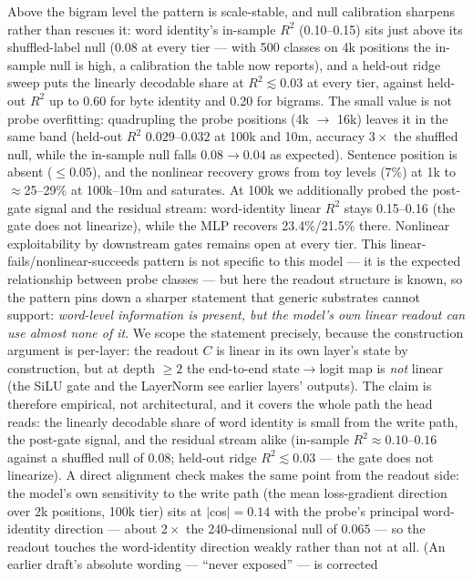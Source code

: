 \documentclass[11pt]{article}
\begin{document}
Above the bigram level the pattern is scale-stable, and null calibration
sharpens rather than rescues it: word identity's in-sample $R^2$
(0.10--0.15) sits just above its shuffled-label null (0.08 at every tier
--- with 500 classes on 4k positions the in-sample null is high, a
calibration the table now reports), and a held-out ridge sweep puts the
linearly decodable share at $R^2 \lesssim 0.03$ at every tier, against
held-out $R^2$ up to 0.60 for byte identity and 0.20 for bigrams. The
small value is not probe overfitting: quadrupling the probe positions
(4k $\to$ 16k) leaves it in the same band (held-out $R^2$
$0.029$--$0.032$ at 100k and 10m, accuracy $3\times$ the shuffled null,
while the in-sample null falls $0.08 \to 0.04$ as expected).
Sentence position is absent ($\le 0.05$), and the nonlinear recovery
grows from toy levels (7\%) at 1k to $\approx$25--29\% at 100k--10m and
saturates.
At 100k we additionally probed the post-gate signal and the residual
stream: word-identity linear $R^2$ stays 0.15--0.16 (the gate does not
linearize), while the MLP recovers 23.4\%/21.5\% there. Nonlinear
exploitability by downstream gates remains open at every tier.
This linear-fails/nonlinear-succeeds
pattern is not specific to this model --- it is the expected relationship
between probe classes --- but here the readout structure is known, so the
pattern pins down a sharper statement that generic substrates cannot
support: \emph{word-level information is
present, but the model's own linear readout can use almost none of it}.
We scope the statement precisely, because the construction argument is
per-layer: the readout $C$ is linear in its own layer's state by
construction, but at depth $\ge 2$ the end-to-end state$\to$logit map is
\emph{not} linear (the SiLU gate and the LayerNorm see earlier layers'
outputs). The claim is therefore empirical, not architectural, and it
covers the whole path the head reads: the linearly decodable share of
word identity is small from the write path, the post-gate signal, and the
residual stream alike (in-sample $R^2 \approx 0.10$--$0.16$ against a
shuffled null of $0.08$; held-out ridge $R^2 \lesssim 0.03$ --- the gate does
not linearize). A direct alignment check makes the same point from the
readout side: the model's own sensitivity to the write path (the mean
loss-gradient direction over 2k positions, 100k tier) sits at
$|$cos$| = 0.14$ with the probe's principal word-identity direction ---
about $2\times$ the 240-dimensional null of $0.065$ --- so the readout
touches the word-identity direction weakly rather than not at all. (An
earlier draft's absolute wording --- ``never exposed'' --- is corrected
\end{document}
